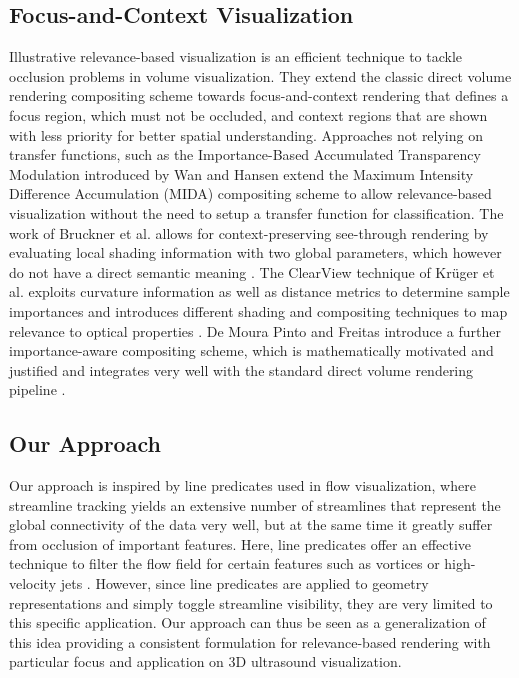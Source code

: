 \subsection{Focus-and-Context Visualization}
Illustrative relevance-based visualization is an efficient technique to tackle occlusion problems in volume visualization. 
They extend the classic direct volume rendering compositing scheme towards focus-and-context rendering that defines a focus region, which must not be occluded, and context regions that are shown with less priority for better spatial understanding. 
Approaches not relying on transfer functions, such as the Importance-Based Accumulated Transparency Modulation introduced by Wan and Hansen \cite{Wan10} extend the Maximum Intensity Difference Accumulation (MIDA) compositing scheme to allow relevance-based visualization without the need to setup a transfer function for classification.
The work of Bruckner et al. allows for context-preserving see-through rendering by evaluating local shading information with two global parameters, which however do not have a direct semantic meaning \cite{Bruckner05}. 
The ClearView technique of Kr\"uger et al. exploits curvature information as well as distance metrics to determine sample importances and introduces different shading and compositing techniques to map relevance to optical properties \cite{Kruger06}. 
De Moura Pinto and Freitas introduce a further importance-aware compositing scheme, which is mathematically motivated and justified and integrates very well with the standard direct volume rendering pipeline \cite{Pinto10}. 

\subsection{Our Approach}
Our approach is inspired by line predicates used in flow visualization, where streamline tracking yields an extensive number of streamlines that represent the global connectivity of the data very well, but at the same time it greatly suffer from occlusion of important features. 
Here, line predicates offer an effective technique to filter the flow field for certain features such as vortices or high-velocity jets \cite{Salzbrunn08,Born13,Kohler13}. 
However, since line predicates are applied to geometry representations and simply toggle streamline visibility, they are very limited to this specific application. 
Our approach can thus be seen as a generalization of this idea providing a consistent formulation for relevance-based rendering with particular focus and application on 3D ultrasound visualization. 


